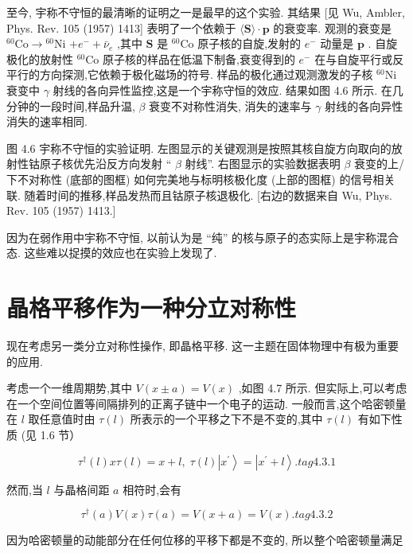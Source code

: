 至今, 宇称不守恒的最清晰的证明之一是最早的这个实验. 其结果 [见 Wu, Ambler, Phys. Rev. 105 (1957) 1413] 表明了一个依赖于 $\langle \mathbf{S}\rangle \cdot \mathbf{p}$ 的衰变率. 观测的衰变是 ${}^{60}\mathrm{{Co}} \rightarrow {}^{60}\mathrm{{Ni}}$ $+ {e}^{ - } + {\bar{\nu }}_{e}$ ,其中 $\mathbf{S}$ 是 ${}^{60}\mathrm{{Co}}$ 原子核的自旋,发射的 ${e}^{ - }$ 动量是 $\mathbf{p}$ . 自旋极化的放射性 ${}^{60}\mathrm{{Co}}$ 原子核的样品在低温下制备,衰变得到的 ${e}^{ - }$ 在与自旋平行或反平行的方向探测,它依赖于极化磁场的符号. 样品的极化通过观测激发的子核 ${}^{60}\mathrm{{Ni}}$ 衰变中 $\gamma$ 射线的各向异性监控,这是一个宇称守恒的效应. 结果如图 4.6 所示. 在几分钟的一段时间,样品升温, $\beta$ 衰变不对称性消失, 消失的速率与 $\gamma$ 射线的各向异性消失的速率相同.


图 4.6 宇称不守恒的实验证明. 左图显示的关键观测是按照其核自旋方向取向的放射性钴原子核优先沿反方向发射 “ $\beta$ 射线”. 右图显示的实验数据表明 $\beta$ 衰变的上/下不对称性 (底部的图框) 如何完美地与标明核极化度 (上部的图框) 的信号相关联. 随着时间的推移,样品发热而且钴原子核退极化. [右边的数据来自 Wu, Phys. Rev. 105 (1957) 1413.]

因为在弱作用中宇称不守恒, 以前认为是 “纯” 的核与原子的态实际上是宇称混合态. 这些难以捉摸的效应也在实验上发现了.

\section{晶格平移作为一种分立对称性}

现在考虑另一类分立对称性操作, 即晶格平移. 这一主题在固体物理中有极为重要的应用.

考虑一个一维周期势,其中 $V\left( {x \pm a}\right) = V\left( x\right)$ ,如图 4.7 所示. 但实际上,可以考虑在一个空间位置等间隔排列的正离子链中一个电子的运动. 一般而言,这个哈密顿量在 $l$ 取任意值时由 $\tau \left( l\right)$ 所表示的一个平移之下不是不变的,其中 $\tau \left( l\right)$ 有如下性质 (见 1.6 节）

$$
{\tau }^{ \dagger }\left( l\right) {x\tau }\left( l\right) = x + l,\;\tau \left( l\right) \left| {x}^{\prime }\right\rangle = \left| {{x}^{\prime } + l}\right\rangle . tag{4.3.1}
$$

然而,当 $l$ 与晶格间距 $a$ 相符时,会有

$$
{\tau }^{ \dagger }\left( a\right) V\left( x\right) \tau \left( a\right) = V\left( {x + a}\right) = V\left( x\right) . tag{4.3.2}
$$

因为哈密顿量的动能部分在任何位移的平移下都是不变的, 所以整个哈密顿量满足

